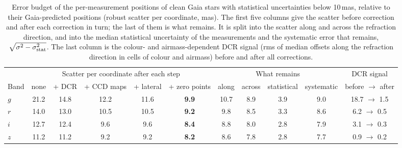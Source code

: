 \begin{table}
\centering
\caption{Error budget of the per-measurement positions of clean Gaia stars with statistical uncertainties below 10\,mas, relative to their Gaia-predicted positions (robust scatter per coordinate, mas). The first five columns give the scatter before correction and after each correction in turn; the last of them is what remains. It is split into the scatter along and across the refraction direction, and into the median statistical uncertainty of the measurements and the systematic error that remains, $\sqrt{\sigma^2 - \sigma_{\rm stat}^2}$. The last column is the colour- and airmass-dependent DCR signal (rms of median offsets along the refraction direction in cells of colour and airmass) before and after all corrections.}
\label{tab:error_budget}
\begin{tabular}{lccccc|cccc|c}
\hline
 & \multicolumn{5}{c|}{Scatter per coordinate after each step} & \multicolumn{4}{c|}{What remains} & DCR signal \\
Band & none & + DCR & + CCD maps & + lateral & + zero points & along & across & statistical & systematic & before $\to$ after \\
\hline
$g$ & 21.2 & 14.8 & 12.2 & 11.6 & \textbf{9.9} & 10.7 & 8.9 & 3.9 & 9.0 & 18.7 $\to$ 1.5 \\
$r$ & 14.0 & 13.0 & 10.5 & 10.5 & \textbf{9.2} & 9.8 & 8.5 & 3.3 & 8.6 & 6.2 $\to$ 0.5 \\
$i$ & 12.7 & 12.4 & 9.6 & 9.6 & \textbf{8.4} & 8.8 & 8.0 & 2.8 & 7.9 & 3.1 $\to$ 0.3 \\
$z$ & 11.2 & 11.2 & 9.2 & 9.2 & \textbf{8.2} & 8.6 & 7.8 & 2.8 & 7.7 & 0.9 $\to$ 0.2 \\
\hline
\end{tabular}
\end{table}

